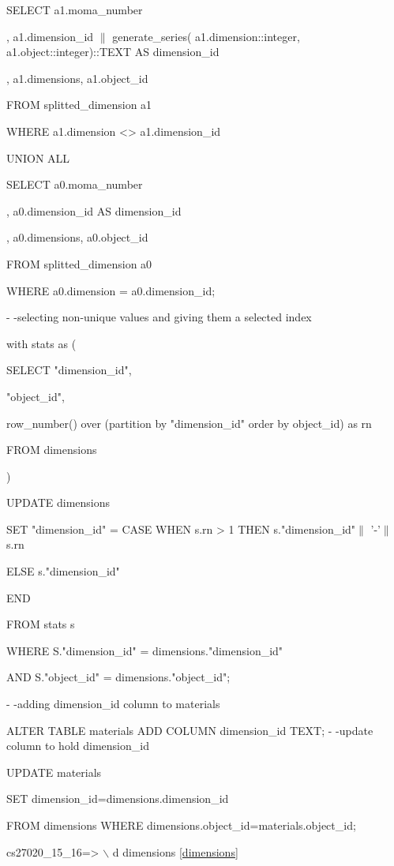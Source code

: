 \documentclass[journal,transmag]{IEEEtran}
\begin{document}
  SELECT a1.moma\_number

       , a1.dimension\_id $\|$ generate\_series( a1.dimension::integer, a1.object::integer)::TEXT AS dimension\_id

       , a1.dimensions, a1.object\_id

FROM splitted\_dimension a1

WHERE a1.dimension <> a1.dimension\_id

UNION ALL

SELECT a0.moma\_number

        , a0.dimension\_id AS dimension\_id

        , a0.dimensions, a0.object\_id

FROM splitted\_dimension a0

WHERE a0.dimension = a0.dimension\_id;

- -selecting non-unique values and giving them a selected index

with stats as (

    SELECT "dimension\_id",

           "object\_id",

           row\_number() over (partition by "dimension\_id" order by object\_id) as rn

    FROM dimensions

)

UPDATE dimensions

   SET "dimension\_id" = CASE WHEN s.rn > 1 THEN s."dimension\_id"$ \|$ '-'$ \|$ s.rn

                   ELSE s."dimension\_id"

              END

  FROM stats s

 WHERE S."dimension\_id" = dimensions."dimension\_id"
  
 AND S."object\_id" = dimensions."object\_id";

- -adding dimension\_id column to materials

ALTER TABLE materials ADD COLUMN dimension\_id TEXT;
- -update column to hold dimension\_id

UPDATE materials

SET dimension\_id=dimensions.dimension\_id

FROM dimensions WHERE dimensions.object\_id=materials.object\_id;
\newline

cs27020\_15\_16=> $\backslash$ d dimensions \ref{dimensions}
\newline
\end{document}
